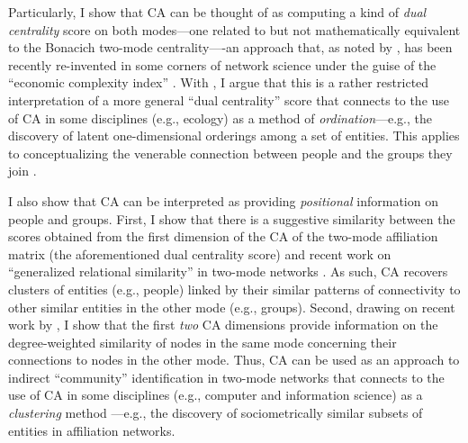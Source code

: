 \documentclass[a4paper,fleqn]{cas-sc}
\begin{document}
Particularly, I show that CA can be thought of as computing a kind of \textit{dual centrality} score on both modes---one related to but not mathematically equivalent to the Bonacich \citeyearpar{bonacich1991simultaneous} two-mode centrality----an approach that, as noted by \citet{van2021correspondence}, has been recently re-invented in some corners of network science under the guise of the ``economic complexity index'' \citep{hidalgo2009building, mealy2019interpreting}. With \citet{van2021correspondence}, I argue that this is a rather restricted interpretation of a more general ``dual centrality'' score that connects to the use of CA in some disciplines (e.g., ecology) as a method of \textit{ordination}---e.g., the discovery of latent one-dimensional orderings among a set of entities. This applies to conceptualizing the venerable connection between people and the groups they join \citep{breiger1974duality}.

I also show that CA can be interpreted as providing \textit{positional} information on people and groups. First, I show that there is a suggestive similarity between the scores obtained from the first dimension of the CA of the two-mode affiliation matrix (the aforementioned dual centrality score) and recent work on ``generalized relational similarity'' in two-mode networks \citep{kovacs2010generalized, lizardo2024two}. As such, CA recovers clusters of entities (e.g., people) linked by their similar patterns of connectivity to other similar entities in the other mode (e.g., groups). Second, drawing on recent work by \citet{van2021correspondence}, I show that the first \textit{two} CA dimensions provide information on the degree-weighted similarity of nodes in the same mode concerning their connections to nodes in the other mode. Thus, CA can be used as an approach to indirect ``community'' identification in two-mode networks that connects to the use of CA in some disciplines (e.g., computer and information science) as a \textit{clustering} method \citep{zha2001bipartite}---e.g., the discovery of sociometrically similar subsets of entities in affiliation networks. 
\end{document}
